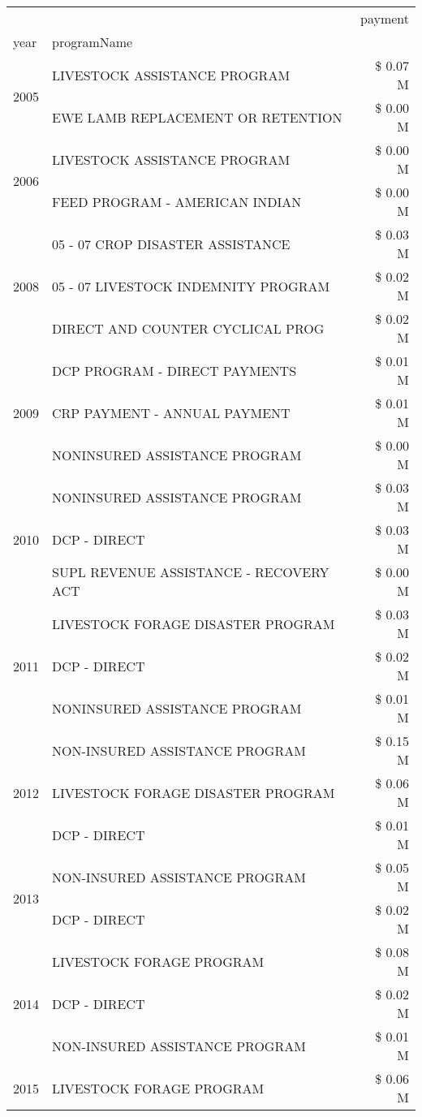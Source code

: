 \begin{tabular}{llr}
\toprule
 &  & payment \\
year & programName &  \\
\midrule
\multirow[t]{2}{*}{2005} & LIVESTOCK ASSISTANCE PROGRAM & \$ 0.07 M \\
 & EWE LAMB REPLACEMENT OR RETENTION & \$ 0.00 M \\
\cline{1-3}
\multirow[t]{2}{*}{2006} & LIVESTOCK ASSISTANCE PROGRAM & \$ 0.00 M \\
 & FEED PROGRAM - AMERICAN INDIAN & \$ 0.00 M \\
\cline{1-3}
\multirow[t]{3}{*}{2008} & 05 - 07 CROP DISASTER ASSISTANCE & \$ 0.03 M \\
 & 05 - 07 LIVESTOCK INDEMNITY PROGRAM & \$ 0.02 M \\
 & DIRECT AND COUNTER CYCLICAL PROG & \$ 0.02 M \\
\cline{1-3}
\multirow[t]{3}{*}{2009} & DCP PROGRAM - DIRECT PAYMENTS & \$ 0.01 M \\
 & CRP PAYMENT - ANNUAL PAYMENT & \$ 0.01 M \\
 & NONINSURED ASSISTANCE PROGRAM & \$ 0.00 M \\
\cline{1-3}
\multirow[t]{3}{*}{2010} & NONINSURED ASSISTANCE PROGRAM & \$ 0.03 M \\
 & DCP - DIRECT & \$ 0.03 M \\
 & SUPL REVENUE ASSISTANCE - RECOVERY ACT & \$ 0.00 M \\
\cline{1-3}
\multirow[t]{3}{*}{2011} & LIVESTOCK FORAGE DISASTER PROGRAM & \$ 0.03 M \\
 & DCP - DIRECT & \$ 0.02 M \\
 & NONINSURED ASSISTANCE PROGRAM & \$ 0.01 M \\
\cline{1-3}
\multirow[t]{3}{*}{2012} & NON-INSURED ASSISTANCE PROGRAM & \$ 0.15 M \\
 & LIVESTOCK FORAGE DISASTER PROGRAM & \$ 0.06 M \\
 & DCP - DIRECT & \$ 0.01 M \\
\cline{1-3}
\multirow[t]{2}{*}{2013} & NON-INSURED ASSISTANCE PROGRAM & \$ 0.05 M \\
 & DCP - DIRECT & \$ 0.02 M \\
\cline{1-3}
\multirow[t]{3}{*}{2014} & LIVESTOCK FORAGE PROGRAM & \$ 0.08 M \\
 & DCP - DIRECT & \$ 0.02 M \\
 & NON-INSURED ASSISTANCE PROGRAM & \$ 0.01 M \\
\cline{1-3}
\multirow[t]{2}{*}{2015} & LIVESTOCK FORAGE PROGRAM & \$ 0.06 M \\

\end{tabular}
